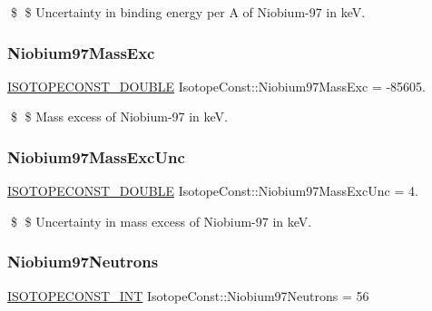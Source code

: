 \$ \$ Uncertainty in binding energy per A of Niobium-\/97 in keV. \mbox{\label{group___isotope_const-_niobium-_nb97_ga4d68d83690a7872b4ce00f6916dd2d6e}} 
\subsubsection{\texorpdfstring{Niobium97\+Mass\+Exc}{Niobium97MassExc}}
{\footnotesize\ttfamily \mbox{\hyperlink{group___isotope_const-_macros_ga8f45a7272ce02c0b4c65c44636ed719a}{I\+S\+O\+T\+O\+P\+E\+C\+O\+N\+S\+T\+\_\+\+D\+O\+U\+B\+LE}} Isotope\+Const\+::\+Niobium97\+Mass\+Exc = -\/85605.}

\$ \$ Mass excess of Niobium-\/97 in keV. \mbox{\label{group___isotope_const-_niobium-_nb97_ga0252a5e80ed5c930bfa1c67af068b629}} 
\subsubsection{\texorpdfstring{Niobium97\+Mass\+Exc\+Unc}{Niobium97MassExcUnc}}
{\footnotesize\ttfamily \mbox{\hyperlink{group___isotope_const-_macros_ga8f45a7272ce02c0b4c65c44636ed719a}{I\+S\+O\+T\+O\+P\+E\+C\+O\+N\+S\+T\+\_\+\+D\+O\+U\+B\+LE}} Isotope\+Const\+::\+Niobium97\+Mass\+Exc\+Unc = 4.}

\$ \$ Uncertainty in mass excess of Niobium-\/97 in keV. \mbox{\label{group___isotope_const-_niobium-_nb97_gab04fb8846c501b4a0505c5d8cdd3b966}} 
\subsubsection{\texorpdfstring{Niobium97\+Neutrons}{Niobium97Neutrons}}
{\footnotesize\ttfamily \mbox{\hyperlink{group___isotope_const-_macros_ga5f18360b3e99483a35c32d789e62621c}{I\+S\+O\+T\+O\+P\+E\+C\+O\+N\+S\+T\+\_\+\+I\+NT}} Isotope\+Const\+::\+Niobium97\+Neutrons = 56}

